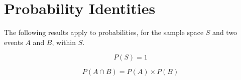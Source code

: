             \section{ Probability Identities}
            \nopagebreak
            \label{m39377*id113940}The following results apply to probabilities, for the sample space
$S$ and two events $A$ and $B$, within $S$.\par 
      \label{m39377*uid57}\nopagebreak\noindent{}
        
    \begin{equation}
    P\left(S\right)=1\tag{11.4}
      \end{equation}
      \label{m39377*uid58}\nopagebreak\noindent{}
        
    \begin{equation}
    P\left(A\cap B\right)=P\left(A\right)\ensuremath{\times}P\left(B\right)\tag{11.5}
      \end{equation}
      \label{m39377*uid59}\nopagebreak\noindent{}
        
